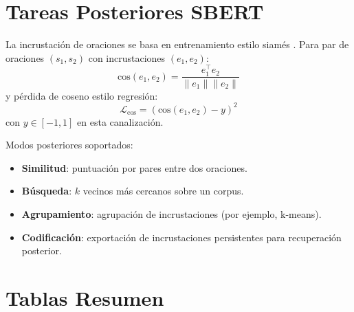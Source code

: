 \documentclass[11pt,a4paper]{article}
\begin{document}
\section{Tareas Posteriores SBERT}
\label{sec:sbert}

La incrustación de oraciones se basa en entrenamiento estilo siamés \citep{reimers_sentence-bert_2019}. Para par de oraciones $(s_1,s_2)$ con incrustaciones $(e_1,e_2)$:
\[
\text{cos}(e_1,e_2)=\frac{e_1^\top e_2}{\|e_1\|\|e_2\|}
\]
y pérdida de coseno estilo regresión:
\[
\mathcal{L}_{\text{cos}}=\left(\text{cos}(e_1,e_2)-y\right)^2
\]
con $y\in[-1,1]$ en esta canalización.

Modos posteriores soportados:
\begin{itemize}[leftmargin=*]
    \item \textbf{Similitud}: puntuación por pares entre dos oraciones.
    \item \textbf{Búsqueda}: $k$ vecinos más cercanos sobre un corpus.
    \item \textbf{Agrupamiento}: agrupación de incrustaciones (por ejemplo, k-means).
    \item \textbf{Codificación}: exportación de incrustaciones persistentes para recuperación posterior.
\end{itemize}

\section{Tablas Resumen}
\label{sec:summary-tables}
\end{document}
